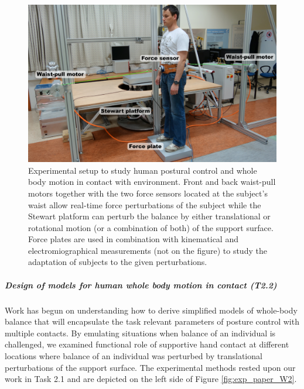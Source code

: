 \documentclass[12pt,a4paper,twoside]{article}
\begin{document}
\begin{figure}
\centering
\includegraphics[width=0.8\hsize]{images/exp_setup_WP2.png}
\caption{Experimental setup to study human postural control and whole body motion in contact with environment. Front and back waist-pull motors together with the two force sensors located at the subject's waist allow real-time force perturbations of the subject while the Stewart platform can perturb the balance by either translational or rotational motion (or a combination of both) of the support surface. Force plates are used in combination with kinematical and electromiographical measurements (not on the figure) to study the adaptation of subjects to the given perturbations.}
\label{fig:exp_protocol_W2}
\end{figure}

\subparagraph{Design of models for human whole body motion in contact (T2.2)}

Work has begun on understanding how to derive simplified models of whole-body balance that will encapsulate the task relevant parameters of posture control with multiple contacts. By emulating situations when balance of an individual is challenged, we examined functional role of supportive hand contact at different locations where balance of an individual was perturbed by translational perturbations of the support surface. The experimental methods rested upon our work in Task 2.1 and are depicted on the left side of Figure \ref{fig:exp_paper_W2}.
\end{document}
